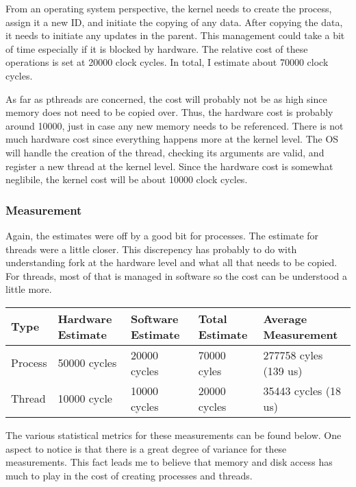 \documentclass[paper=a4, fontsize=11pt]{scrartcl}
\numberwithin{equation}{section}        %
\numberwithin{figure}{section}          %
\numberwithin{table}{section}               %
\begin{document}
From an operating system perspective, the kernel needs to create the process, assign it a new ID, and initiate the copying of any data.  After copying the data, it needs to initiate any updates in the parent.  This management could take a bit of time especially if it is blocked by hardware.  The relative cost of these operations is set at 20000 clock cycles.  In total, I estimate about 70000 clock cycles.

As far as pthreads are concerned, the cost will probably not be as high since memory does not need to be copied over.  Thus, the hardware cost is probably around 10000, just in case any new memory needs to be referenced.  There is not much hardware cost since everything happens more at the kernel level.  The OS will handle the creation of the thread, checking its arguments are valid, and register a new thread at the kernel level.  Since the hardware cost is somewhat neglibile, the kernel cost will be about 10000 clock cycles. 

\subsubsection{Measurement}

Again, the estimates were off by a good bit for processes.  The estimate for threads were a little closer.  This discrepency has probably to do with understanding fork at the hardware level and what all that needs to be copied.  For threads, most of that is managed in software so the cost can be understood a little more.

\begin{center}
    \begin{tabular}{ | l | l | l | l | l |}
    \hline
    Type & Hardware Estimate & Software Estimate & Total Estimate & Average Measurement \\      \hline
    Process & 50000 cycles & 20000 cycles & 70000 cyles & 277758 cyles (139 us) \\ 
    Thread & 10000 cycle & 10000 cycles & 20000 cycles & 35443 cycles (18 us) \\
    \hline
    \end{tabular}
\end{center}

The various statistical metrics for these measurements can be found below.  One aspect to notice is that there is a great degree of variance for these measurements.  This fact leads me to believe that memory and disk access has much to play in the cost of creating processes and threads.
\end{document}
